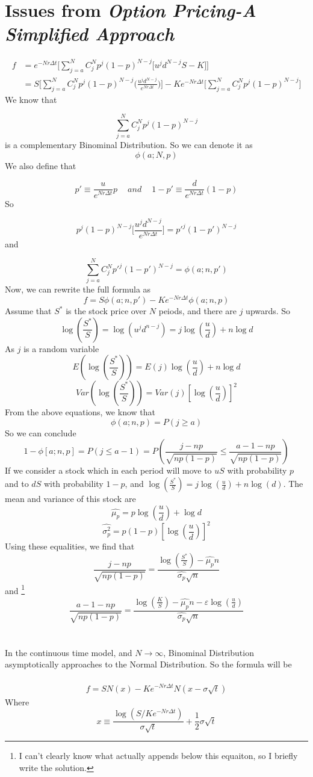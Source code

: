 \documentclass[12pt]{article}
\begin{document}
\section{Issues from \emph{Option Pricing-A Simplified Approach}}
\begin{align*}
    f &= e^{-Nr\Delta t} \Bigg[\sum_{j=a}^N C^N_j p^j (1-p)^{N-j} \big[u^j d^{N-j}S-K\big]\Bigg]\\
    & = S\Bigg[\sum_{j=a}^N C^N_j p^j (1-p)^{N-j} \Bigg(\frac{u^j d^{N-j}}{e^{Nr\Delta t}}\Bigg)\Bigg]-Ke^{-Nr\Delta t}\Bigg[\sum_{j=a}^N C^N_j p^j (1-p)^{N-j}\Bigg]
\end{align*}
We know that 

\[
    \sum_{j=a}^N C^N_j p^j (1-p)^{N-j}
\]
is a complementary Binominal Distribution. So we can denote it as
\[
    \phi(a;N,p)
\]
We also define that

\[
    p'\equiv \frac{u}{e^{Nr\Delta t}}p\quad\  and\quad\  1-p' \equiv \frac{d}{e^{Nr\Delta t}}(1-p)
\]
So

\[
    p^j (1-p)^{N-j} \Bigg[\frac{u^j d^{N-j}}{e^{Nr\Delta t}}\Bigg]=p'^j (1-p')^{N-j}
\]
and

\[
    \sum_{j=a}^N C^N_j p'^j (1-p')^{N-j} = \phi(a;n,p')
\]
Now, we can rewrite the full formula as
\[
    f = S\phi(a;n,p')-Ke^{-Nr\Delta t}\phi(a;n,p)
\]
Assume that $S^*$ is the stock price over $N$ peiods, and there are $j$ upwards. So
\[
    \log(\frac{S^*}{S}) = \log(u^j d^{n-j}) = j\log(\frac{u}{d})+n\log d  
\]
As $j$ is a random variable
\[
    E(\log(\frac{S^*}{S})) = E(j)\log(\frac{u}{d})+n\log d  
\]
\[
    Var(\log(\frac{S^*}{S})) = Var(j)[\log(\frac{u}{d})]^2
\]
\newpage
From the above equations, we know that
\[
    \phi(a;n,p) = P(j\ge a)  
\]
So we can conclude
\[
    1-\phi[a;n,p] = P(j\leq a-1) = P(\frac{j-np}{\sqrt{np(1-p)}}\leq \frac{a-1-np}{\sqrt{np(1-p)}})  
\]
If we consider a stock which in each period will move to $uS$ with probability $p$ and to $dS$ with probability $1-p$, and $\log(\frac{S^*}{S}) = j\log(\frac{u}{d})+n\log(d)$. The mean and variance of this stock are
\[
    \hat{\mu_p} = p\log(\frac{u}{d})+\log d 
\]
\[
    \hat{\sigma^2_p} = p(1-p)[\log(\frac{u}{d})]^2  
\]
Using these equalities, we find that
\[
    \frac{j-np}{\sqrt{np(1-p)}} = \frac{\log(\frac{S^*}{S}) - \hat{\mu_p}n}{\hat{\sigma_p}\sqrt{n}}
\] 
and \footnote[1]{I can't clearly know what actually appends below this equaiton, so I briefly write the solution.}
\[
    \frac{a-1-np}{\sqrt{np(1-p)}} = \frac{\log(\frac{K}{S}) - \hat{\mu_p}n - \varepsilon\log(\frac{u}{d})}{\hat{\sigma_p}\sqrt{n}}  
\]
\\\\
In the continuous time model, and $N\to\infty$, Binominal Distribution asymptotically approaches to the Normal Distribution. So the formula will be\\\\
\begin{align*}
    f = SN(x)-Ke^{-Nr\Delta t}N(x-\sigma \sqrt{t})
\end{align*}
Where
\[
    x \equiv \frac{\log(S/Ke^{-Nr\Delta t})}{\sigma \sqrt{t}}
+\frac{1}{2}\sigma \sqrt{t}\]
 
\end{document}

